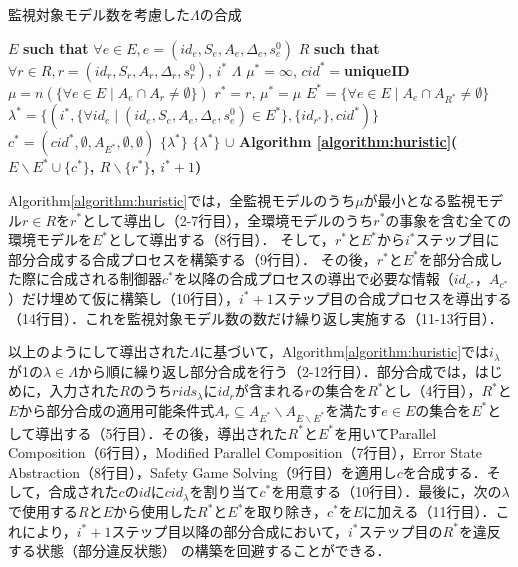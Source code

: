 \begin{algorithm}[h]
\caption{監視対象モデル数を考慮した$\Lambda$の合成}
\label{algorithm:huristic}
\begin{algorithmic}[1]
\renewcommand{\algorithmicrequire}{\textbf{Input:}}
\renewcommand{\algorithmicensure}{\textbf{Output:}}
\REQUIRE $E$ {\bf such that} $\forall e \in E, e = (id_{e}, S_{e}, A_{e}, \Delta_{e}, s^0_{e})$
\REQUIRE $R$ {\bf such that} $\forall r \in R, r = (id_{r}, S_{r}, A_{r}, \Delta_{r}, s^0_{r})$, $i^*$
\ENSURE  $\Lambda$
\STATE $\mu^*= \infty$,\;\; $cid^* = ${\bf uniqueID}
    \STATE $\mu = n(\{\forall e \in E \mid A_e \cap A_r \neq \emptyset\})$
    \IF{$\mu < \mu^*$}
        \STATE $r^* = r$,\;\; $\mu^* = \mu$
    \ENDIF
\ENDFOR
\STATE $E^* = \{\forall e \in E \mid A_{e} \cap A_{R^*} \neq \emptyset\}$
\STATE $\lambda^* = \{(i^*, \{\forall id_{e} \mid (id_{e}, S_{e}, A_{e}, \Delta_{e}, s^0_{e}) \in E^*\}, \{id_{r^*}\}, cid^*)\}$
\STATE $c^* = (cid^*, \emptyset, A_{E^*}, \emptyset, \emptyset)$
 $\{\lambda^*\}$
\ENDIF
{} $\{\lambda^*\}$ $\cup$ {\bf Algorithm \ref{algorithm:huristic}($E \backslash E^* \cup \{c^*\}$, $R \backslash \{r^*\}$, $i^*+1$)}
\end{algorithmic}
\end{algorithm}

Algorithm\ref{algorithm:huristic}では，全監視モデルのうち$\mu$が最小となる監視モデル$r \in R$を$r^*$として導出し（2-7行目），全環境モデルのうち$r^*$の事象を含む全ての環境モデルを$E^*$として導出する（8行目）．
そして，$r^*$と$E^*$から$i^*$ステップ目に部分合成する合成プロセスを構築する（9行目）．
その後，$r^*$と$E^*$を部分合成した際に合成される制御器$c^*$を以降の合成プロセスの導出で必要な情報（$id_{c^*}$，$A_{c^*}$）だけ埋めて仮に構築し（10行目），$i^*+1$ステップ目の合成プロセスを導出する（14行目）．これを監視対象モデル数の数だけ繰り返し実施する（11-13行目）．

以上のようにして導出された$\Lambda$に基づいて，Algorithm\ref{algorithm:huristic}では$i_{\lambda}$が1の$\lambda \in \Lambda$から順に繰り返し部分合成を行う（2-12行目）．部分合成では，はじめに，入力された$R$のうち$rids_{\lambda}$に$id_{r}$が含まれる$r$の集合を$R^*$とし（4行目），$R^*$と$E$から部分合成の適用可能条件式$A_{r} \subseteq A_{E^*} \backslash A_{E \backslash E^*}$を満たす$e \in E$の集合を$E^*$として導出する（5行目）．その後，導出された$R^*$と$E^*$を用いてParallel Composition（6行目），Modified Parallel Composition（7行目），Error State Abstraction（8行目），Safety Game Solving（9行目）を適用し$c$を合成する．そして，合成された$c$の$id$に$cid_{\lambda}$を割り当て$c^*$を用意する（10行目）．最後に，次の$\lambda$で使用する$R$と$E$から使用した$R^*$と$E^*$を取り除き，$c^*$を$E$に加える（11行目）．これにより，$i^*+1$ステップ目以降の部分合成において，$i^*$ステップ目の$R^*$を違反する状態（部分違反状態）
の構築を回避することができる．

